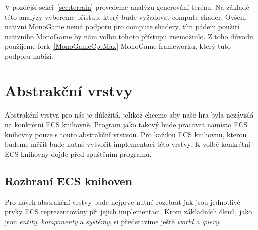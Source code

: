 V pozdější sekci~\ref{sec:terrain} provedeme analýzu generování terénu. Na základě této analýzy vybereme přístup, který bude vyžadovat compute shader. Ovšem nativní MonoGame nemá podporu pro compute shadery, tím pádem použití nativního MonoGame by nám volbu tohoto přístupu znemožnilo. Z toho důvodu použijeme fork~\ref{MonoGameCptMax} MonoGame frameworku, který tuto podporu nabízí.

\section{Abstrakční vrstvy}
\label{section:abstract-layer-analysis}
Abstrakční vrstva pro nás je důležitá, jelikož chceme aby naše hra byla nezávislá na konkrétní ECS knihovně. Program jako takový bude pracovat namísto ECS knihovny pouze s touto abstrakční vrstvou. Pro každou ECS knihovnu, kterou budeme měřit bude nutné vytvořit implementaci této vrstvy. K volbě konkrétní ECS knihovny dojde před spuštěním programu.

\subsection{Rozhraní ECS knihoven}
Pro návrh abstrakční vrstvy bude nejprve nutné rozebrat jak jsou jednotlivé prvky ECS reprezentovány při jejich implementaci. Krom základních členů, jako jsou \textit{entity}, \textit{komponenty} a \textit{systémy}, si představíme ještě \textit{world} a \textit{query}.

